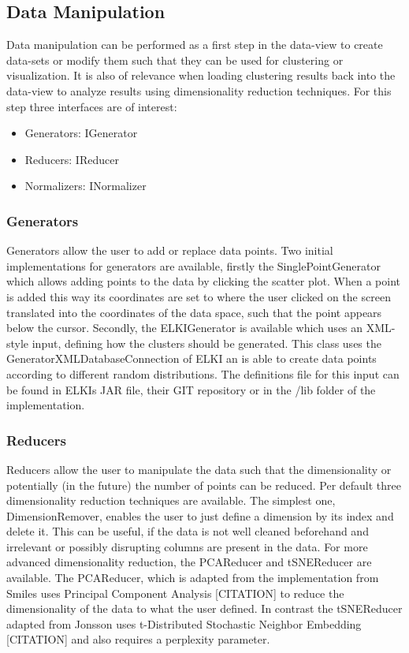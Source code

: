\documentclass[
	a4paper,
	english,
	twoside,
	openright,               
	11pt                            
	]{report}
\begin{document}
\subsection{Data Manipulation}

Data manipulation can be performed as a first step in the data-view to create data-sets or modify them such that they can be used for clustering or visualization. It is also of relevance when loading clustering results back into the data-view to analyze results using dimensionality reduction techniques. For this step three interfaces are of interest:

\begin{itemize}
  \item Generators: IGenerator
  \item Reducers: IReducer
  \item Normalizers: INormalizer
\end{itemize}

\subsubsection{Generators}
Generators allow the user to add or replace data points. Two initial implementations for generators are available, firstly the SinglePointGenerator which allows adding points to the data by clicking the scatter plot. When a point is added this way its coordinates are set to where the user clicked on the screen translated into the coordinates of the data space, such that the point appears below the cursor. Secondly, the ELKIGenerator is available which uses an XML-style input, defining how the clusters should be generated. This class uses the GeneratorXMLDatabaseConnection of ELKI \cite{10.1007/978-3-540-69497-7_41} an is able to create data points according to different random distributions. The definitions file for this input can be found in ELKIs JAR file, their GIT repository \cite{elkixml} or in the /lib folder of the implementation.

\subsubsection{Reducers}
Reducers allow the user to manipulate the data such that the dimensionality or potentially (in the future) the number of points can be reduced. Per default three dimensionality reduction techniques are available. The simplest one, DimensionRemover, enables the user to just define a dimension by its index and delete it. This can be useful, if the data is not well cleaned beforehand and irrelevant or possibly disrupting columns are present in the data. For more advanced dimensionality reduction, the PCAReducer and tSNEReducer are available. The PCAReducer, which is adapted from the implementation from Smiles \cite{javasmile} uses Principal Component Analysis [CITATION] to reduce the dimensionality of the data to what the user defined. In contrast the tSNEReducer adapted from Jonsson \cite{javatsne} uses t-Distributed Stochastic Neighbor Embedding [CITATION] and also requires a perplexity parameter.
\end{document}
